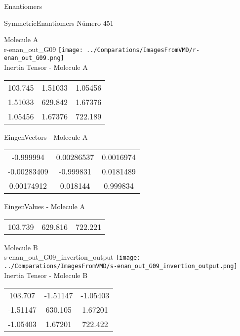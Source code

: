 \begin{center}
\vtab
\vtab
\textcolor{NavyBlue}{\Large Enantiomers}
\end{center}

 \newpage

\vtab[-2cm]
\begin{center}
{\large SymmetricEnantiomers \tab Número 451}
\end{center}
\begin{multicols}{2}
\begin{center}

Molecule A \\ 
r-enan\_out\_G09
\texttt{[image: ../Comparations/ImagesFromVMD/r-enan\_out\_G09.png]}
\\
Inertia Tensor - Molecule A \\
\vtab

\begin{tabular}{|c c c|}
103.745	 & 	1.51033	 & 	1.05456	 \\
1.51033	 & 	629.842	 & 	1.67376	 \\
1.05456	 & 	1.67376	 & 	722.189
\end{tabular}

\vtab
 EingenVectors - Molecule A     \\
\vtab
\begin{tabular}{|c c c|}
-0.999994	 & 	0.00286537	 & 	0.0016974	 \\
-0.00283409	 & 	-0.999831	 & 	0.0181489	 \\
0.00174912	 & 	0.018144	 & 	0.999834
\end{tabular}

\vtab
 EingenValues - Molecule A     \\
\vtab
\begin{tabular}{|c c c|}
103.739	 & 	629.816	 & 	722.221	 \\
\end{tabular}
\columnbreak

Molecule B \\ 
s-enan\_out\_G09\_invertion\_output
\texttt{[image: ../Comparations/ImagesFromVMD/s-enan\_out\_G09\_invertion\_output.png]}
\\
Inertia Tensor - Molecule B \\
\vtab

\begin{tabular}{|c c c|}
103.707	 & 	-1.51147	 & 	-1.05403	 \\
-1.51147	 & 	630.105	 & 	1.67201	 \\
-1.05403	 & 	1.67201	 & 	722.422
\end{tabular}


\end{center}
\end{multicols}
